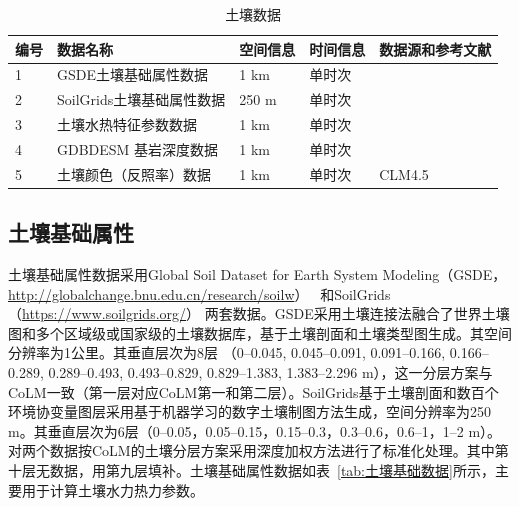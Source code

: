 \begin{table}[htbp]
  \begin{threeparttable}
    \centering
    \caption{土壤数据}
    \label{tab:土壤数据}
    \begin{tabular}{p{1cm}p{5.5cm}p{2cm}p{2cm}p{3.5cm}}
      \toprule
      编号 & 数据名称                  & 空间信息 & 时间信息 & 数据源和参考文献            \\
      \midrule
      1    & GSDE土壤基础属性数据      & 1 km     & 单时次   & \cite{shangguan2014global}  \\
      2    & SoilGrids土壤基础属性数据 & 250 m    & 单时次   & \cite{poggio2021soilgrids}  \\
      3    & 土壤水热特征参数数据      & 1 km     & 单时次   & \cite{dai2019global}        \\
      4    & GDBDESM 基岩深度数据      & 1 km     & 单时次   & \cite{shangguan2017mapping} \\
      5    & 土壤颜色（反照率）数据    & 1 km     & 单时次   & CLM4.5                      \\
      \bottomrule
    \end{tabular}
  \end{threeparttable}
\end{table}

\subsection{土壤基础属性}\label{土壤基础属性}
土壤基础属性数据采用Global Soil Dataset for Earth System Modeling（GSDE，\url{http://globalchange.bnu.edu.cn/research/soilw}）~\citep{shangguan2014global}
和SoilGrids（\url{https://www.soilgrids.org/}）\citep{poggio2021soilgrids} 两套数据。GSDE采用土壤连接法融合了世界土壤图和多个区域级或国家级的土壤数据库，基于土壤剖面和土壤类型图生成。其空间分辨率为1公里。其垂直层次为8层 （0--0.045, 0.045--0.091, 0.091--0.166, 0.166--0.289, 0.289--0.493, 0.493--0.829, 0.829--1.383, 1.383--2.296 m），这一分层方案与CoLM一致（第一层对应CoLM第一和第二层）。SoilGrids基于土壤剖面和数百个环境协变量图层采用基于机器学习的数字土壤制图方法生成，空间分辨率为250 m。其垂直层次为6层（0--0.05，0.05--0.15，0.15--0.3，0.3--0.6，0.6--1，1--2 m）。对两个数据按CoLM的土壤分层方案采用深度加权方法进行了标准化处理。其中第十层无数据，用第九层填补。土壤基础属性数据如表~\ref{tab:土壤基础数据}所示，主要用于计算土壤水力热力参数。

